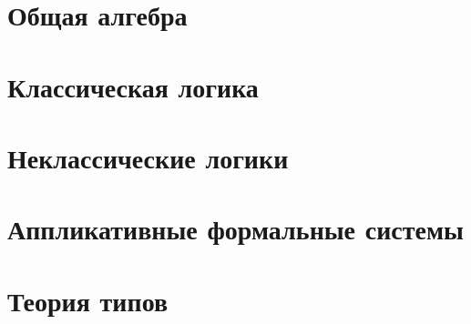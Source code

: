 \documentclass[12pt,a5paper,oneside,final]{report}
\begin{document}
    \maketitle
    \tableofcontents
    \clearpage

    \chapter{Общая алгебра}
    

    \chapter{Классическая логика}
    

    \chapter{Неклассические логики}
    

    \chapter{Аппликативные формальные системы}
    

    \chapter{Теория типов}
    
\end{document}
